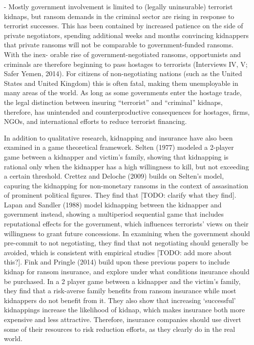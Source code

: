 \documentclass[12pt]{article}
\begin{document}
- Mostly government involvement is limited to (legally uninsurable) terrorist kidnaps, but ransom demands in the criminal sector are rising in response to terrorist successes. This has been contained by increased patience on the side of private negotiators, spending additional weeks and months convincing kidnappers that private ransoms will not be comparable to government-funded ransoms. With the inex- orable rise of government-negotiated ransoms, opportunists and criminals are therefore beginning to pass hostages to terrorists (Interviews IV, V; Safer Yemen, 2014). For citizens of non-negotiating nations (such as the United States and United Kingdom) this is often fatal, making them unemployable in many areas of the world. As long as some governments enter the hostage trade, the legal distinction between insuring “terrorist” and “criminal” kidnaps, therefore, has unintended and counterproductive consequences for hostages, firms, NGOs, and international efforts to reduce terrorist financing.

In addition to qualitative research, kidnapping and insurance have also been examined in a game theoretical framework. Selten (1977) modeled a 2-player game between a kidnapper and victim's family, showing that kidnapping is rational only when the kidnapper has a high willingness to kill, but not exceeding a certain threshold. Crettez and Deloche (2009) builds on Selten's model, capuring the kidnapping for non-monetary ransoms in the context of assasination of prominent political figures. They find that [TODO: clarify what they find]. Lapan and Sandler (1988) model kidnapping between the kidnapper and government instead, showing a multiperiod sequential game that includes reputational effects for the government, which influences terrorists' views on their willingness to grant future concessions. In examining when the government should pre-commit to not negotiating, they find that not negotiating should generally be avoided, which is consistent with empirical studies [TODO: add more about this?]. Fink and Pringle (2014) build upon these previous papers to include kidnap for ransom insurance, and explore under what conditions insurance should be purchased. In a 2 player game between a kidnapper and the victim's family, they find that a risk-averse family benefits from ransom insurance while most kidnappers do not benefit from it. They also show that increasing `successful' kidnappings increase the likelihood of kidnap, which makes insurance both more expensive and less attractive. Therefore, insurance companies should use divert some of their resources to risk reduction efforts, as they clearly do in the real world.
\end{document}
